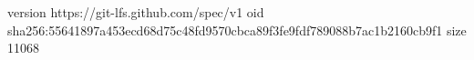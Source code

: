 version https://git-lfs.github.com/spec/v1
oid sha256:55641897a453ecd68d75c48fd9570cbca89f3fe9fdf789088b7ac1b2160cb9f1
size 11068
